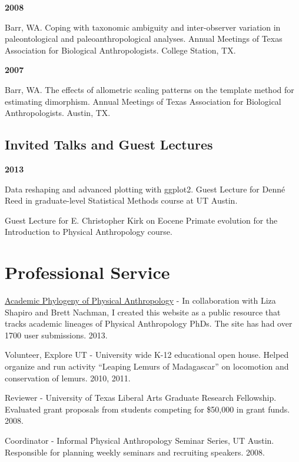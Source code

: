 \documentclass{article}
\begin{document}
\begin{description*}
\item[] {\bfseries 2008}
\item[] Barr, WA. Coping with taxonomic ambiguity and inter-observer variation in paleontological and paleoanthropological analyses. Annual Meetings of Texas Association for Biological Anthropologists. College Station, TX.
\end{description*}
\begin{description*}
\item[] {\bfseries 2007}
\item[] Barr, WA. The effects of allometric scaling patterns on the template method for estimating dimorphism. Annual Meetings of Texas Association for Biological Anthropologists. Austin, TX.
\end{description*}
\subsection*{Invited Talks and Guest Lectures}

\begin{description*}
\item[] {\bfseries 2013}
\item[] Data reshaping and advanced plotting with ggplot2. Guest Lecture for Denn\'{e} Reed in graduate-level Statistical Methods course at UT Austin.

\item[] Guest Lecture for E. Christopher Kirk on Eocene Primate evolution for the Introduction to Physical Anthropology course.
\end{description*}
\section*{Professional Service}
\begin{description*}
\item[] \href{http://www.physanthphylogeny.org}{Academic Phylogeny of Physical Anthropology} - In collaboration with Liza Shapiro and Brett Nachman, I created this website as a public resource that tracks academic lineages of Physical Anthropology PhDs. The site has had over 1700 user submissions. 2013.

\item[] Volunteer, Explore UT - University wide K-12 educational open house. Helped organize and run activity ``Leaping Lemurs of Madagascar'' on locomotion and conservation of lemurs. 2010, 2011.

\item[] Reviewer - University of Texas Liberal Arts Graduate Research Fellowship. Evaluated grant proposals from students competing for \$50,000 in grant funds. 2008.

\item[] Coordinator - Informal Physical Anthropology Seminar Series, UT Austin. Responsible for planning weekly seminars and recruiting speakers. 2008.
\end{description*}
\end{document}
